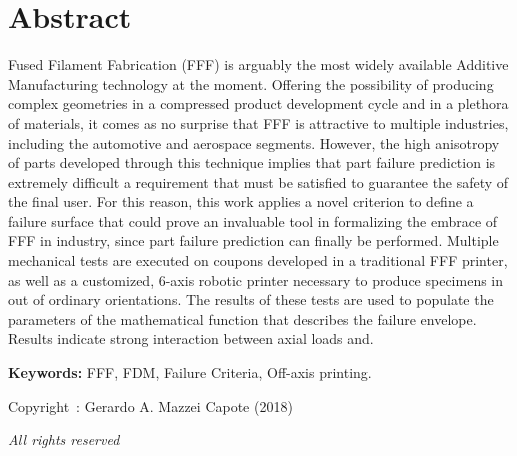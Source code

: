 \documentclass[main.tex]{subfiles}
\begin{document}
\setcounter{page}{1}
\chapter*{Abstract}
Fused Filament Fabrication (FFF) is arguably the most widely available Additive Manufacturing technology at the moment. Offering the possibility of producing complex geometries in a compressed product development cycle and in a plethora of materials, it comes as no surprise that FFF is attractive to multiple industries, including the automotive and aerospace segments. However, the high anisotropy of parts developed through this technique implies that part failure prediction is extremely difficult \textemdash a requirement that must be satisfied to guarantee the safety of the final user. For this reason, this work applies a novel criterion to define a failure surface that could prove an invaluable tool in formalizing the embrace of FFF in industry, since part failure prediction can finally be performed. Multiple mechanical tests are executed on coupons developed in a traditional FFF printer, as well as a customized, 6-axis robotic printer necessary to produce specimens in out of ordinary orientations. The results of these tests are used to populate the parameters of the mathematical function that describes the failure envelope. Results indicate strong interaction between axial loads and. %
 
\vspace{10mm} %
\textbf{Keywords:} FFF, FDM, Failure Criteria, Off-axis printing.

\vfill
\begin{center}
Copyright~\textcopyright: Gerardo A. Mazzei Capote (2018)

\emph{All rights reserved}	
\end{center}
\end{document}
